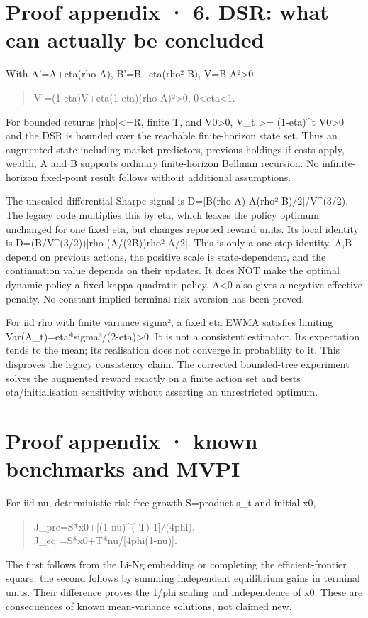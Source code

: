 \documentclass[10pt,a4paper]{article}
\begin{document}
\clearpage
\section*{Proof appendix · 6. DSR: what can actually be concluded}
With A'=A+eta(rho-A), B'=B+eta(rho²-B), V=B-A²>0,

\begin{quote}\small
V'=(1-eta)V+eta(1-eta)(rho-A)²>0,  0<eta<1.
\end{quote}
For bounded returns |rho|<=R, finite T, and V0>0, V\_t >= (1-eta)\textasciicircum{}t V0>0 and the DSR is bounded over the reachable finite-horizon state set. Thus an augmented state including market predictors, previous holdings if costs apply, wealth, A and B supports ordinary finite-horizon Bellman recursion. No infinite-horizon fixed-point result follows without additional assumptions.

The unscaled differential Sharpe signal is D=[B(rho-A)-A(rho²-B)/2]/V\textasciicircum{}(3/2). The legacy code multiplies this by eta, which leaves the policy optimum unchanged for one fixed eta, but changes reported reward units. Its local identity is D=(B/V\textasciicircum{}(3/2))[rho-(A/(2B))rho²-A/2]. This is only a one-step identity. A,B depend on previous actions, the positive scale is state-dependent, and the continuation value depends on their updates. It does NOT make the optimal dynamic policy a fixed-kappa quadratic policy. A<0 also gives a negative effective penalty. No constant implied terminal risk aversion has been proved.

For iid rho with finite variance sigma², a fixed eta EWMA satisfies limiting Var(A\_t)=eta*sigma²/(2-eta)>0. It is not a consistent estimator. Its expectation tends to the mean; its realisation does not converge in probability to it. This disproves the legacy consistency claim. The corrected bounded-tree experiment solves the augmented reward exactly on a finite action set and tests eta/initialisation sensitivity without asserting an unrestricted optimum.

\clearpage
\section*{Proof appendix · known benchmarks and MVPI}
For iid nu, deterministic risk-free growth S=product s\_t and initial x0,

\begin{quote}\small
J\_pre=S*x0+[(1-nu)\textasciicircum{}(-T)-1]/(4phi),\\
J\_eq =S*x0+T*nu/[4phi(1-nu)].
\end{quote}
The first follows from the Li-Ng embedding or completing the efficient-frontier square; the second follows by summing independent equilibrium gains in terminal units. Their difference proves the 1/phi scaling and independence of x0. These are consequences of known mean-variance solutions, not claimed new.
\end{document}
